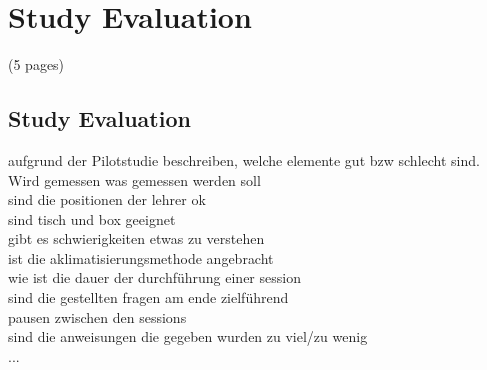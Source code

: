 \chapter{Study Evaluation}
(5 pages)
\section{Study Evaluation}
aufgrund der Pilotstudie beschreiben, welche elemente gut bzw schlecht sind.\\
Wird gemessen was gemessen werden soll\\
sind die positionen der lehrer ok\\
sind tisch und box geeignet\\
gibt es schwierigkeiten etwas zu verstehen\\
ist die aklimatisierungsmethode angebracht\\
wie ist die dauer der durchführung einer session\\
sind die gestellten fragen am ende zielführend\\
pausen zwischen den sessions\\
sind die anweisungen die gegeben wurden zu viel/zu wenig\\
...\\